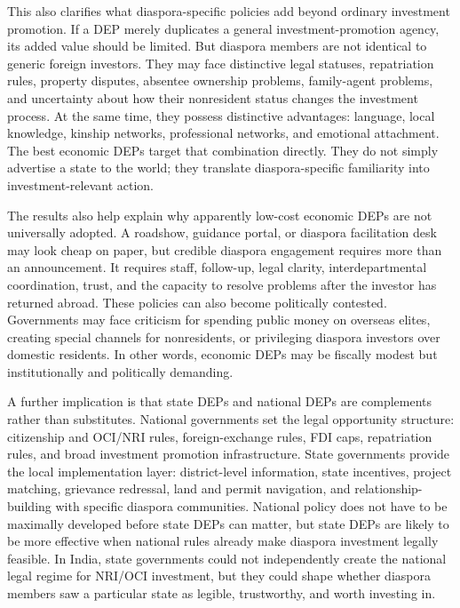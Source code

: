 \documentclass[doublespace,nopageskip]{UVAthesis}
\begin{document}
This also clarifies what diaspora-specific policies add beyond ordinary investment promotion. If a DEP merely duplicates a general investment-promotion agency, its added value should be limited. But diaspora members are not identical to generic foreign investors. They may face distinctive legal statuses, repatriation rules, property disputes, absentee ownership problems, family-agent problems, and uncertainty about how their nonresident status changes the investment process. At the same time, they possess distinctive advantages: language, local knowledge, kinship networks, professional networks, and emotional attachment. The best economic DEPs target that combination directly. They do not simply advertise a state to the world; they translate diaspora-specific familiarity into investment-relevant action.

The results also help explain why apparently low-cost economic DEPs are not universally adopted. A roadshow, guidance portal, or diaspora facilitation desk may look cheap on paper, but credible diaspora engagement requires more than an announcement. It requires staff, follow-up, legal clarity, interdepartmental coordination, trust, and the capacity to resolve problems after the investor has returned abroad. These policies can also become politically contested. Governments may face criticism for spending public money on overseas elites, creating special channels for nonresidents, or privileging diaspora investors over domestic residents. In other words, economic DEPs may be fiscally modest but institutionally and politically demanding.

A further implication is that state DEPs and national DEPs are complements rather than substitutes. National governments set the legal opportunity structure: citizenship and OCI/NRI rules, foreign-exchange rules, FDI caps, repatriation rules, and broad investment promotion infrastructure. State governments provide the local implementation layer: district-level information, state incentives, project matching, grievance redressal, land and permit navigation, and relationship-building with specific diaspora communities. National policy does not have to be maximally developed before state DEPs can matter, but state DEPs are likely to be more effective when national rules already make diaspora investment legally feasible. In India, state governments could not independently create the national legal regime for NRI/OCI investment, but they could shape whether diaspora members saw a particular state as legible, trustworthy, and worth investing in.
\end{document}
